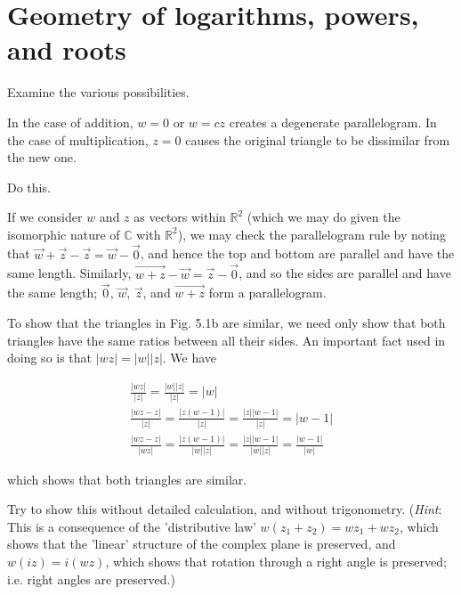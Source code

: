 \documentclass[../the-road-to-reality.tex]{subfiles}
\begin{document}
	
\section{Geometry of logarithms, powers, and roots}

\begin{questions}

\question Examine the various possibilities.

\begin{solution}
	In the case of addition, $w = 0$ or $w = cz$ creates a degenerate parallelogram. In the case of multiplication, $z = 0$ causes the original triangle to be dissimilar from the new one.
\end{solution}

\question Do this.

\begin{solution}
	If we consider $w$ and $z$ as vectors within $\mathbb{R}^2$ (which we may do given the isomorphic nature of $\mathbb{C}$ with $\mathbb{R}^2$), we may check the parallelogram rule by noting that $\vec{w} + \vec{z} - \vec{z} = \vec{w} - \vec{0}$, and hence the top and bottom are parallel and have the same length. Similarly, $\vec{w + z} - \vec{w} = \vec{z} - \vec{0}$, and so the sides are parallel and have the same length; $\vec{0}$, $\vec{w}$, $\vec{z}$, and $\vec{w + z}$ form a parallelogram.

	To show that the triangles in Fig. 5.1b are similar, we need only show that both triangles have the same ratios between all their sides. An important fact used in doing so is that $|wz| = |w||z|$. We have
	
	\begin{gather*}
		\frac{|wz|}{|z|}=\frac{|w||z|}{|z|}=|w| \\
		\frac{|wz - z|}{|z|}=\frac{|z(w-1)|}{|z|}=\frac{|z||w-1|}{|z|}=|w-1| \\
		\frac{|wz-z|}{|wz|} = \frac{|z(w-1)|}{|w||z|} = \frac{|z||w-1|}{|w||z|}=\frac{|w-1|}{|w|}
	\end{gather*}
	
	which shows that both triangles are similar.
\end{solution}

\question Try to show this without detailed calculation, and without trigonometry. (\textit{Hint}: This is a consequence of the 'distributive law' $w(z_1 + z_2) = wz_1 + wz_2$, which shows that the 'linear' structure of the complex plane is preserved, and $w(iz) = i(wz)$, which shows that rotation through a right angle is preserved; i.e. right angles are preserved.)


\end{questions}
\end{document}
